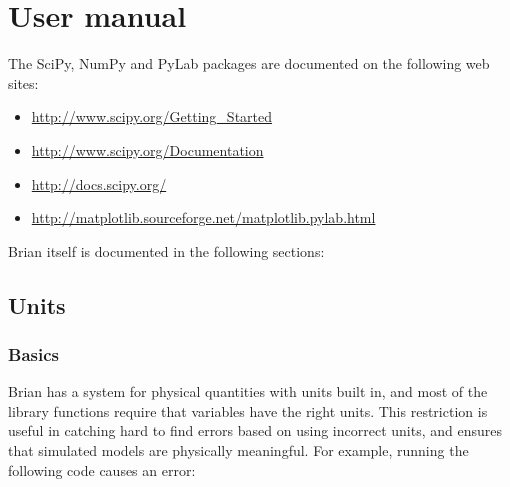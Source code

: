 \documentclass[letterpaper,10pt,english]{manual}
\begin{document}
\hypertarget{user-manual}{}\chapter{User manual}
The SciPy, NumPy and PyLab packages are documented on the following web sites:
\begin{itemize}
\item {} 
\href{http://www.scipy.org/Getting\_Started}{http://www.scipy.org/Getting\_Started}

\item {} 
\href{http://www.scipy.org/Documentation}{http://www.scipy.org/Documentation}

\item {} 
\href{http://docs.scipy.org/}{http://docs.scipy.org/}

\item {} 
\href{http://matplotlib.sourceforge.net/matplotlib.pylab.html}{http://matplotlib.sourceforge.net/matplotlib.pylab.html}

\end{itemize}

Brian itself is documented in the following sections:

\resetcurrentobjects
\hypertarget{--doc-units}{}

\section{Units}


\subsection{Basics}

Brian has a system for physical quantities with units built in, and most of the
library functions require that variables have the right units. This restriction
is useful in catching hard to find errors based on using incorrect units, and
ensures that simulated models are physically meaningful. For example, running
the following code causes an error:
\end{document}
